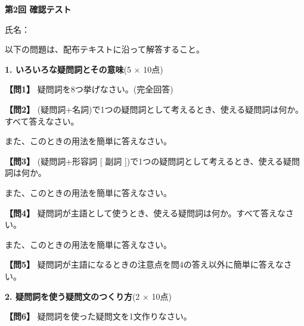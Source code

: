 
\begin{center}
{\Large\textbf{第2回 確認テスト}}
\end{center}

\vspace{0.2em}
\begin{flushright}
氏名：\underline{\hspace{14em}}
\end{flushright}

\vspace{0.3em}
\noindent 以下の問題は、配布テキストに沿って解答すること。

\vspace{0.4em}
\noindent\textbf{1. いろいろな疑問詞とその意味}(5 $\times$ 10点)

\noindent\textbf{【問1】} 疑問詞を8つ挙げなさい。(完全回答)

\testqsep

\noindent\textbf{【問2】} (疑問詞+名詞)で1つの疑問詞として考えるとき、使える疑問詞は何か。すべて答えなさい。

また、このときの用法を簡単に答えなさい。

\testqsep

\noindent\textbf{【問3】} (疑問詞+形容詞 [ 副詞 ])で1つの疑問詞として考えるとき、使える疑問詞は何か。

また、このときの用法を簡単に答えなさい。

\testqsep

\noindent\textbf{【問4】} 疑問詞が主語として使うとき、使える疑問詞は何か。すべて答えなさい。

また、このときの用法を簡単に答えなさい。

\testqsep

\noindent\textbf{【問5】} 疑問詞が主語になるときの注意点を問4の答え以外に簡単に答えなさい。

\testsectsep

\noindent\textbf{2. 疑問詞を使う疑問文のつくり方}(2 $\times$ 10点)

\noindent\textbf{【問6】} 疑問詞を使った疑問文を1文作りなさい。

